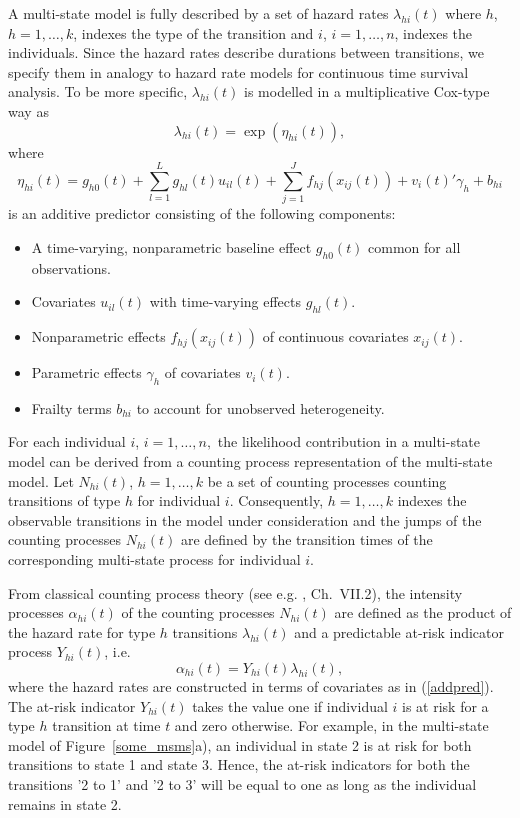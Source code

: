 \documentclass[11pt,a4paper,twoside]{bayesxarticle}
\begin{document}
A multi-state model is fully described by a set of hazard rates
$\lambda_{hi}(t)$ where $h$, $h=1,\ldots,k$, indexes the type of the
transition and $i$, $i=1,\ldots,n$, indexes the individuals. Since
the hazard rates describe durations between transitions, we specify
them in analogy to hazard rate models for continuous time survival
analysis. To be more specific, $\lambda_{hi}(t)$ is modelled in a
multiplicative Cox-type way as
\[
 \lambda_{hi}(t) = \exp(\eta_{hi}(t)),
\]
where
\begin{equation}\label{addpred}
 \eta_{hi}(t) = g_{h0}(t) + \sum_{l=1}^Lg_{hl}(t)u_{il}(t) +
 \sum_{j=1}^Jf_{hj}(x_{ij}(t)) + v_i(t)'\gamma_h +  b_{hi}
\end{equation}
is an additive predictor consisting of the following components:
\begin{itemize}
 \item A time-varying, nonparametric baseline effect $g_{h0}(t)$ common for all
 observations.
 \item Covariates $u_{il}(t)$ with time-varying effects $g_{hl}(t)$.
 \item Nonparametric effects $f_{hj}(x_{ij}(t))$ of continuous covariates
 $x_{ij}(t)$.
 \item Parametric effects $\gamma_h$ of covariates $v_i(t)$.
 \item Frailty terms $b_{hi}$ to account for unobserved
 heterogeneity.
\end{itemize}

For each individual $i$, $i=1,\ldots,n,$ the likelihood contribution
in a multi-state model can be derived from a counting process
representation of the multi-state model. Let $N_{hi}(t)$,
$h=1,\ldots,k$ be a set of counting processes counting transitions
of type $h$ for individual $i$. Consequently, $h=1,\ldots,k$ indexes
the observable transitions in the model under consideration and the
jumps of the counting processes $N_{hi}(t)$ are defined by the
transition times of the corresponding multi-state process for
individual $i$.

From classical counting process theory (see e.g. , Ch.~VII.2), the intensity processes $\alpha_{hi}(t)$
of the counting processes $N_{hi}(t)$ are defined as the product of the hazard rate for type $h$ transitions $ \lambda_{hi}(t)$
and a predictable at-risk indicator process $Y_{hi}(t)$, i.e.
\[
 \alpha_{hi}(t) = Y_{hi}(t) \lambda_{hi}(t),
\]
where the hazard rates are constructed in terms of covariates as in
(\ref{addpred}). The at-risk indicator $Y_{hi}(t)$ takes the value
one if individual $i$ is at risk for a type $h$ transition at time
$t$ and zero otherwise. For example, in the multi-state model of
Figure~\ref{some_msms}a), an individual in state 2 is at risk for
both transitions to state 1 and state 3. Hence, the at-risk
indicators for both the transitions '2 to 1' and '2 to 3' will be
equal to one as long as the individual remains in state 2.
\end{document}

